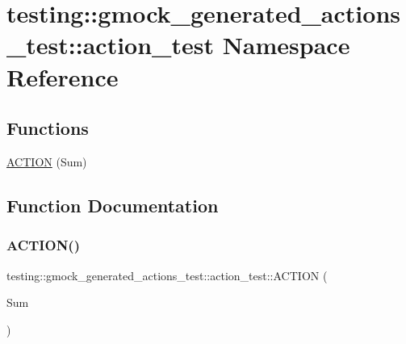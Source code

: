 \hypertarget{namespacetesting_1_1gmock__generated__actions__test_1_1action__test}{}\section{testing\+:\+:gmock\+\_\+generated\+\_\+actions\+\_\+test\+:\+:action\+\_\+test Namespace Reference}
\label{namespacetesting_1_1gmock__generated__actions__test_1_1action__test}
\subsection*{Functions}
\begin{DoxyCompactItemize}
\item 
\hyperlink{namespacetesting_1_1gmock__generated__actions__test_1_1action__test_a78d00ea4fff98d5cd3f73f8f03800bbe}{A\+C\+T\+I\+ON} (Sum)
\end{DoxyCompactItemize}


\subsection{Function Documentation}
\mbox{\label{namespacetesting_1_1gmock__generated__actions__test_1_1action__test_a78d00ea4fff98d5cd3f73f8f03800bbe}} 
\subsubsection{\texorpdfstring{A\+C\+T\+I\+O\+N()}{ACTION()}}
{\footnotesize\ttfamily testing\+::gmock\+\_\+generated\+\_\+actions\+\_\+test\+::action\+\_\+test\+::\+A\+C\+T\+I\+ON (\begin{DoxyParamCaption}\item[{Sum}]{ }\end{DoxyParamCaption})}

